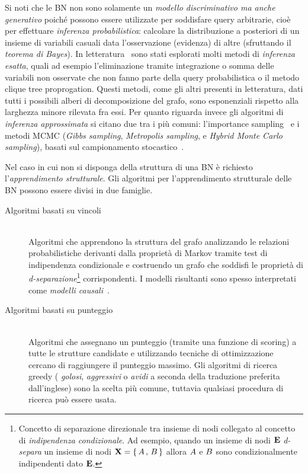 Si noti che le \acl{BN} non sono solamente un \emph{modello discriminativo ma anche generativo} poiché possono essere utilizzate per soddisfare query arbitrarie, cioè per effettuare \emph{inferenza probabilistica}: calcolare la distribuzione a posteriori di un insieme di variabili casuali data l'osservazione (evidenza) di altre (sfruttando il \emph{teorema di Bayes}). In letteratura~\citep[si veda][]{Heckerman1996} sono stati esplorati molti metodi di \emph{inferenza esatta}, quali ad esempio l'eliminazione tramite integrazione o somma delle variabili non osservate che non fanno parte della query probabilistica o il metodo clique tree proprogation. Questi metodi, come gli altri presenti in letteratura, dati tutti i possibili alberi di decomposizione del grafo, sono esponenziali rispetto alla larghezza minore rilevata fra essi. Per quanto riguarda invece gli algoritmi di \emph{inferenza approssimata} si citano due tra i più comuni: l'importance sampling~\citep{Shachter1990} e i metodi \acf{MCMC} (\emph{Gibbs sampling}, \emph{Metropolis sampling}, e \emph{Hybrid Monte Carlo sampling}), basati sul campionamento stocastico~\citep[si veda][]{Geman1984,Gilks1996,MacKay1998}.

Nel caso in cui non si disponga della struttura di una \acs{BN} è richiesto l'\emph{apprendimento strutturale}. Gli algoritmi per l'apprendimento strutturale delle \acl{BN} possono essere divisi in due famiglie.
\begin{description}
    \item[Algoritmi basati su vincoli] \hfill \\
    Algoritmi che apprendono la struttura del grafo analizzando le relazioni probabilistiche derivanti dalla proprietà di Markov tramite test di indipendenza condizionale e costruendo un grafo che soddisfi le proprietà di \emph{d-separazione}\footnote{Concetto di separazione direzionale tra insieme di nodi collegato al concetto di \emph{indipendenza condizionale}. Ad esempio, quando un insieme di nodi $\mathbf{E}$ \emph{d-separa} un insieme di nodi $\mathbf{X}=\{\,\mathnormal{A}\,,\,\mathnormal{B}\,\}$ allora $\mathnormal{A}$ e $\mathnormal{B}$ sono condizionalmente indipendenti dato $\mathbf{E}$.} corrispondenti. I modelli risultanti sono spesso interpretati come \emph{modelli causali}~\citep{Pearl1988}.
    \item[Algoritmi basati su punteggio] \hfill \\
    Algoritmi che assegnano un punteggio (tramite una funzione di scoring) a tutte le strutture candidate e utilizzando tecniche di ottimizzazione cercano di raggiungere il punteggio massimo. Gli algoritmi di ricerca greedy (\ie{} \emph{golosi}, \emph{aggressivi} o \emph{avidi} a seconda della traduzione preferita dall'inglese) sono la scelta più comune, tuttavia qualsiasi procedura di ricerca può essere usata.
\end{description}

